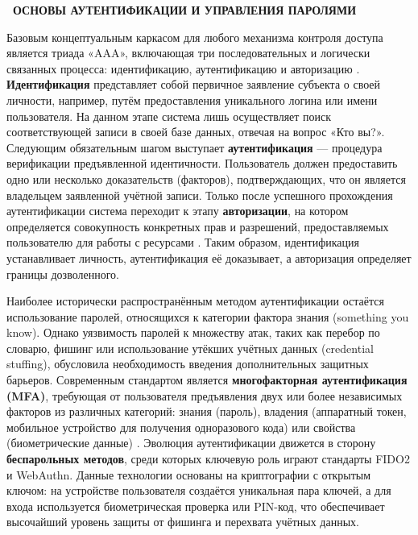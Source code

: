 \documentclass{SibFU-docs}
\begin{document}
\newpage
{}
\begin{center}\textbf{\thesection\ ОСНОВЫ АУТЕНТИФИКАЦИИ И УПРАВЛЕНИЯ ПАРОЛЯМИ}\end{center}
\vspace*{-1.5em}

Базовым концептуальным каркасом для любого механизма контроля доступа является триада «AAA», включающая три последовательных и логически связанных процесса: идентификацию, аутентификацию и авторизацию \cite{keeper_auth_vs_authz_2023}. \textbf{Идентификация} представляет собой первичное заявление субъекта о своей личности, например, путём предоставления уникального логина или имени пользователя. На данном этапе система лишь осуществляет поиск соответствующей записи в своей базе данных, отвечая на вопрос «Кто вы?». Следующим обязательным шагом выступает \textbf{аутентификация} — процедура верификации предъявленной идентичности. Пользователь должен предоставить одно или несколько доказательств (факторов), подтверждающих, что он является владельцем заявленной учётной записи. Только после успешного прохождения аутентификации система переходит к этапу \textbf{авторизации}, на котором определяется совокупность конкретных прав и разрешений, предоставляемых пользователю для работы с ресурсами \cite{keeper_auth_vs_authz_2023}. Таким образом, идентификация устанавливает личность, аутентификация её доказывает, а авторизация определяет границы дозволенного.


Наиболее исторически распространённым методом аутентификации остаётся использование паролей, относящихся к категории фактора знания (something you know). Однако уязвимость паролей к множеству атак, таких как перебор по словарю, фишинг или использование утёкших учётных данных (credential stuffing), обусловила необходимость введения дополнительных защитных барьеров. Современным стандартом является \textbf{многофакторная аутентификация (MFA)}, требующая от пользователя предъявления двух или более независимых факторов из различных категорий: знания (пароль), владения (аппаратный токен, мобильное устройство для получения одноразового кода) или свойства (биометрические данные) \cite{nist_passwords_2024}. Эволюция аутентификации движется в сторону \textbf{беспарольных методов}, среди которых ключевую роль играют стандарты FIDO2 и WebAuthn. Данные технологии основаны на криптографии с открытым ключом: на устройстве пользователя создаётся уникальная пара ключей, а для входа используется биометрическая проверка или PIN-код, что обеспечивает высочайший уровень защиты от фишинга и перехвата учётных данных.
\end{document}
